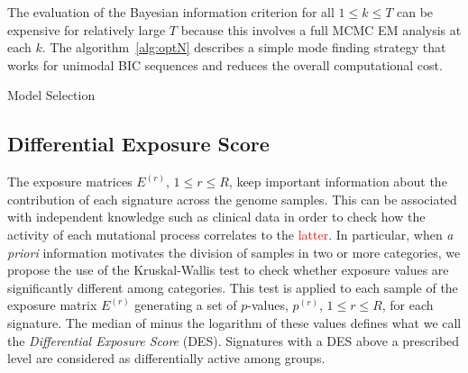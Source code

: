 \documentclass{bioinfo}
\makeatletter
\def\BState{\State\hskip-\ALG@thistlm}
\makeatother
\begin{document}
The evaluation of the Bayesian information criterion for all
$1\leq k \leq T$ can be expensive for relatively large $T$
because this involves a full MCMC EM analysis at each $k$. The
algorithm~\ref{alg:optN} describes a simple mode finding strategy that
works for unimodal BIC sequences and reduces the overall computational
cost.

\begin{algorithm}
\caption{Model Selection}\label{alg:optN}
\end{algorithm}

\subsection{Differential Exposure Score}\label{sec:DES}
The exposure matrices $E^{(r)}$, $1 \leq r \leq R$, keep important
information about the contribution of each signature across the genome
samples. This can be associated with independent knowledge such as
clinical data in order to check how the activity of each mutational
process correlates to the \textcolor{red}{latter}. In particular, when
\emph{a priori} information motivates the division of samples in two
or more categories, we propose the use of the Kruskal-Wallis test to
check whether exposure values are significantly different among
categories. This test is applied to each sample of the exposure matrix
$E^{(r)}$ generating a set of $p$-values, $p^{(r)}$, $1 \leq r \leq
R$, for each signature. The median of minus the logarithm of these
values defines what we call the \emph{Differential Exposure Score}
(DES). Signatures with a DES above a prescribed level are considered
as differentially active among groups.
\end{document}
